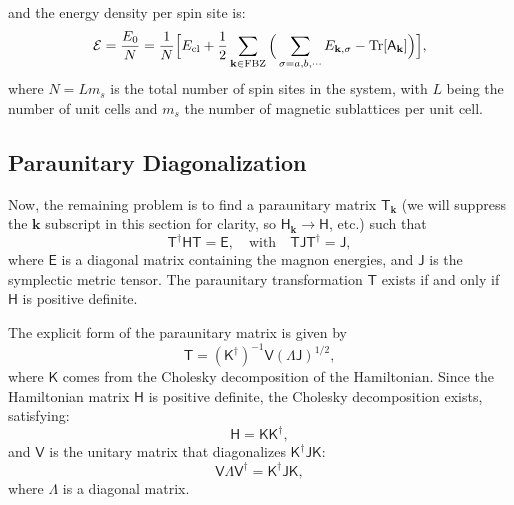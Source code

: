 \documentclass[aps, prx, nofootinbib, superscriptaddress]{revtex4-2}
\newcommand{\kvec}{\mathbf{k}}
\newcommand{\Tr}{\mathrm{Tr}}
\begin{document}
and the energy density per spin site is:
\begin{equation}
    \mathcal{E} 
    = \frac{E_{0}}{N} 
    = \frac{1}{N} \Big[ E_{\rm cl} + \frac{1}{2} \sum_{\mathbf{k} \in \mathrm{FBZ}} \Big( \sum_{\sigma=a,b,\cdots} E_{\mathbf{k}, \sigma} -  \Tr[\mathsf{A}_{\mathbf{k}}] \Big) \Big],
\end{equation}
where $N=Lm_{s}$ is the total number of spin sites in the system, with $L$ being the number of unit cells and $m_s$ the number of magnetic sublattices per unit cell.



\subsection{Paraunitary Diagonalization}
Now, the remaining problem is to find a paraunitary matrix $\mathsf{T}_{\kvec}$ (we will suppress the $\kvec$ subscript in this section for clarity, so $\mathsf{H}_{\kvec} \rightarrow \mathsf{H}$, etc.) such that
\begin{equation}
    \mathsf{T}^{\dagger}\mathsf{HT} = \mathsf{E}, \quad \text{with}
    \quad \mathsf{TJT}^{\dagger} = \mathsf{J},
\end{equation}
where $\mathsf{E}$ is a diagonal matrix containing the magnon energies, and $\mathsf{J}$ is the symplectic metric tensor. The paraunitary transformation $\mathsf{T}$ exists if and only if $\mathsf{H}$ is positive definite.

The explicit form of the paraunitary matrix is given by 
\begin{equation}
    \mathsf{T} = (\mathsf{K}^{\dagger})^{-1} \mathsf{V} \mathsf{(\Lambda J)}^{1/2},
\end{equation}
where $\mathsf{K}$ comes from the Cholesky decomposition of the Hamiltonian. Since the Hamiltonian matrix $\mathsf{H}$ is positive definite, the Cholesky decomposition exists, satisfying:
\begin{equation}
    \mathsf{H} = \mathsf{KK}^{\dagger},
\end{equation}
and $\mathsf{V}$ is the unitary matrix that diagonalizes $\mathsf{K}^{\dagger} \mathsf{JK}$:
\begin{equation}
    \mathsf{V \Lambda V}^{\dagger} = \mathsf{K}^{\dagger} \mathsf{JK},
\end{equation}
where $\mathsf{\Lambda}$ is a diagonal matrix.
\end{document}
